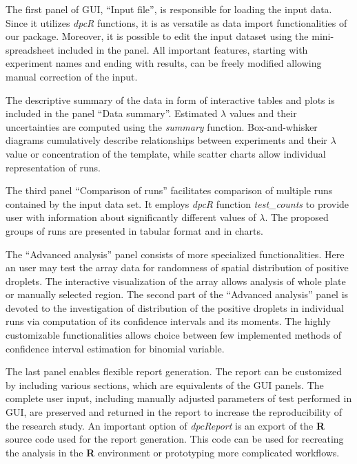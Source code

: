 \documentclass[a4,center,fleqn]{NAR}
\begin{document}
The first panel of GUI, ``Input file'', is responsible for loading the input 
data. Since it utilizes \textit{dpcR} functions, it is as versatile as data 
import functionalities of our package. Moreover, it is possible to edit the 
input dataset using the mini-spreadsheet included in the panel. All important 
features, starting with experiment names and ending with results, can be freely 
modified allowing manual correction of the input.

The descriptive summary of the data in form of interactive tables and plots is 
included in the panel ``Data summary''. Estimated $\lambda$ values and their 
uncertainties are computed using the \textit{summary} function. Box-and-whisker 
diagrams cumulatively describe relationships between experiments and their 
$\lambda$ value or concentration of the template, while scatter charts allow 
individual representation of runs.

The third panel ``Comparison of runs'' facilitates comparison of multiple runs 
contained by the input data set. It employs \textit{dpcR} function 
\textit{test\_counts} to provide user with information about significantly 
different values of $\lambda$. The proposed groups of runs are presented in 
tabular format and in charts.

The ``Advanced analysis'' panel consists of more specialized 
functionalities. Here an user may test the array data for randomness of 
spatial distribution of positive droplets. The interactive visualization of the 
array allows analysis of whole plate or manually selected region. The second 
part of the ``Advanced analysis'' panel is devoted to the investigation of 
distribution of the positive droplets in individual runs via computation of 
its confidence intervals and its moments. The highly customizable 
functionalities allows choice between few implemented methods of confidence 
interval estimation for binomial variable.

The last panel enables flexible report generation. The report can be customized 
by including various sections, which are equivalents of the GUI panels. The 
complete user input, including manually adjusted parameters of test performed in 
GUI, are preserved and returned in the report to increase the reproducibility of 
the research study. An important option of \textit{dpcReport} is an export of 
the \textbf{R} source code used for the report generation. This code can be used 
for recreating the analysis in the \textbf{R} environment or prototyping more 
complicated workflows.
\end{document}
